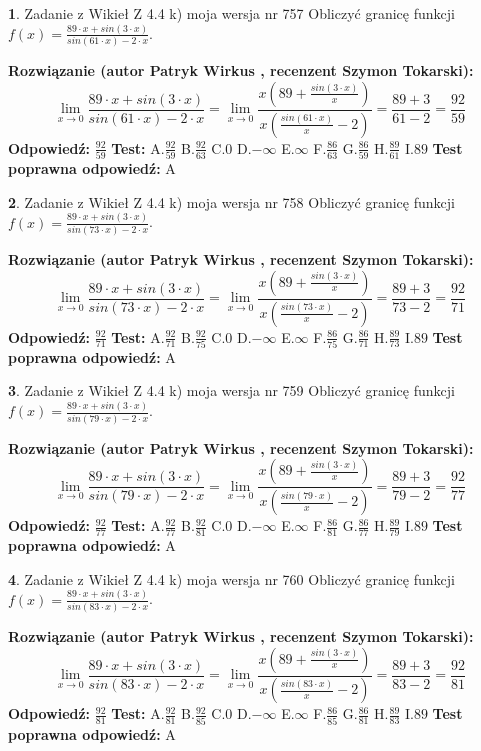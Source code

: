 \documentclass[12pt, a4paper]{article}
\theoremstyle{definition} %
\newtheorem{zad}{}
\newcommand{\zadStart}[1]{\begin{zad}#1\newline}
\newcommand{\zadStop}{\end{zad}}
\newcommand{\rozwStart}[2]{\noindent \textbf{Rozwiązanie (autor #1 , recenzent #2): }\newline}
\newcommand{\rozwStop}{\newline}
\newcommand{\odpStart}{\noindent \textbf{Odpowiedź:}\newline}
\newcommand{\odpStop}{\newline}
\newcommand{\testStart}{\noindent \textbf{Test:}\newline}
\newcommand{\testStop}{\newline}
\newcommand{\kluczStart}{\noindent \textbf{Test poprawna odpowiedź:}\newline}
\newcommand{\kluczStop}{\newline}
\begin{document}
\zadStart{Zadanie z Wikieł Z 4.4 k) moja wersja nr 757}
Obliczyć granicę funkcji $f(x)=\frac{89\cdot x +sin(3\cdot x)}{sin(61\cdot x) -2\cdot x}$.
\zadStop
\rozwStart{Patryk Wirkus}{Szymon Tokarski}
$$\lim\limits_{x\to 0}\frac{89\cdot x +sin(3\cdot x)}{sin(61\cdot x) -2\cdot x}
=\lim\limits_{x\to 0}\frac{x(89+\frac{sin(3\cdot x)}{x})}{x(\frac{sin(61\cdot x)}{x}-2)}
=\frac{89+3}{61-2} = \frac{92}{59}$$
\rozwStop
\odpStart
$\frac{92}{59}$
\odpStop
\testStart
A.$\frac{92}{59}$
B.$\frac{92}{63}$
C.$0$
D.$-\infty$
E.$\infty$
F.$\frac{86}{63}$
G.$\frac{86}{59}$
H.$\frac{89}{61}$
I.$89$
\testStop
\kluczStart
A
\kluczStop



\zadStart{Zadanie z Wikieł Z 4.4 k) moja wersja nr 758}
Obliczyć granicę funkcji $f(x)=\frac{89\cdot x +sin(3\cdot x)}{sin(73\cdot x) -2\cdot x}$.
\zadStop
\rozwStart{Patryk Wirkus}{Szymon Tokarski}
$$\lim\limits_{x\to 0}\frac{89\cdot x +sin(3\cdot x)}{sin(73\cdot x) -2\cdot x}
=\lim\limits_{x\to 0}\frac{x(89+\frac{sin(3\cdot x)}{x})}{x(\frac{sin(73\cdot x)}{x}-2)}
=\frac{89+3}{73-2} = \frac{92}{71}$$
\rozwStop
\odpStart
$\frac{92}{71}$
\odpStop
\testStart
A.$\frac{92}{71}$
B.$\frac{92}{75}$
C.$0$
D.$-\infty$
E.$\infty$
F.$\frac{86}{75}$
G.$\frac{86}{71}$
H.$\frac{89}{73}$
I.$89$
\testStop
\kluczStart
A
\kluczStop



\zadStart{Zadanie z Wikieł Z 4.4 k) moja wersja nr 759}
Obliczyć granicę funkcji $f(x)=\frac{89\cdot x +sin(3\cdot x)}{sin(79\cdot x) -2\cdot x}$.
\zadStop
\rozwStart{Patryk Wirkus}{Szymon Tokarski}
$$\lim\limits_{x\to 0}\frac{89\cdot x +sin(3\cdot x)}{sin(79\cdot x) -2\cdot x}
=\lim\limits_{x\to 0}\frac{x(89+\frac{sin(3\cdot x)}{x})}{x(\frac{sin(79\cdot x)}{x}-2)}
=\frac{89+3}{79-2} = \frac{92}{77}$$
\rozwStop
\odpStart
$\frac{92}{77}$
\odpStop
\testStart
A.$\frac{92}{77}$
B.$\frac{92}{81}$
C.$0$
D.$-\infty$
E.$\infty$
F.$\frac{86}{81}$
G.$\frac{86}{77}$
H.$\frac{89}{79}$
I.$89$
\testStop
\kluczStart
A
\kluczStop



\zadStart{Zadanie z Wikieł Z 4.4 k) moja wersja nr 760}
Obliczyć granicę funkcji $f(x)=\frac{89\cdot x +sin(3\cdot x)}{sin(83\cdot x) -2\cdot x}$.
\zadStop
\rozwStart{Patryk Wirkus}{Szymon Tokarski}
$$\lim\limits_{x\to 0}\frac{89\cdot x +sin(3\cdot x)}{sin(83\cdot x) -2\cdot x}
=\lim\limits_{x\to 0}\frac{x(89+\frac{sin(3\cdot x)}{x})}{x(\frac{sin(83\cdot x)}{x}-2)}
=\frac{89+3}{83-2} = \frac{92}{81}$$
\rozwStop
\odpStart
$\frac{92}{81}$
\odpStop
\testStart
A.$\frac{92}{81}$
B.$\frac{92}{85}$
C.$0$
D.$-\infty$
E.$\infty$
F.$\frac{86}{85}$
G.$\frac{86}{81}$
H.$\frac{89}{83}$
I.$89$
\testStop
\kluczStart
A
\kluczStop
\end{document}

